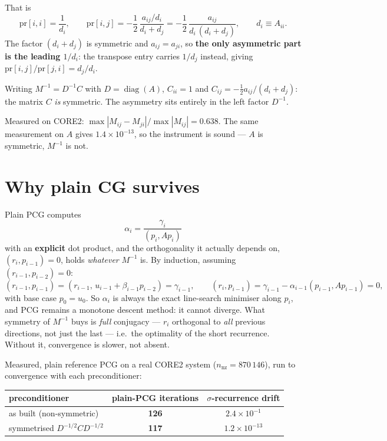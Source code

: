 \documentclass[11pt,a4paper]{article}
\newcommand{\Mi}{M^{-1}}
\begin{document}
That is
\begin{equation}
  \mathrm{pr}[i,i]=\frac{1}{d_i},\qquad
  \mathrm{pr}[i,j]=-\frac{1}{2}\,\frac{a_{ij}/d_i}{d_i+d_j}
  =-\frac{1}{2}\,\frac{a_{ij}}{d_i\,(d_i+d_j)},\qquad d_i\equiv A_{ii}.
\end{equation}
The factor $(d_i+d_j)$ is symmetric and $a_{ij}=a_{ji}$, so \textbf{the only asymmetric part is
the leading $1/d_i$}: the transpose entry carries $1/d_j$ instead, giving
$\mathrm{pr}[i,j]/\mathrm{pr}[j,i]=d_j/d_i$.

Writing $\Mi=D^{-1}C$ with $D=\operatorname{diag}(A)$, $C_{ii}=1$ and
$C_{ij}=-\tfrac12 a_{ij}/(d_i+d_j)$: the matrix $C$ \emph{is} symmetric. The asymmetry sits
entirely in the left factor $D^{-1}$.

Measured on CORE2: $\max|M_{ij}-M_{ji}| / \max|M_{ij}| = \mathbf{0.638}$. The same measurement
on $A$ gives $1.4\times10^{-13}$, so the instrument is sound --- $A$ is symmetric, $\Mi$ is not.

\section{Why plain CG survives}

Plain PCG computes
\[
  \alpha_i=\frac{\gamma_i}{(p_i,Ap_i)}
\]
with an \textbf{explicit} dot product, and the orthogonality it actually depends on,
$(r_i,p_{i-1})=0$, holds \emph{whatever} $\Mi$ is. By induction, assuming
$(r_{i-1},p_{i-2})=0$:
\[
  (r_{i-1},p_{i-1}) = (r_{i-1},\,u_{i-1}+\beta_{i-1}p_{i-2}) = \gamma_{i-1},
  \qquad
  (r_i,p_{i-1}) = \gamma_{i-1} - \alpha_{i-1}(p_{i-1},Ap_{i-1}) = 0,
\]
with base case $p_0=u_0$. So $\alpha_i$ is always the exact line-search minimiser along $p_i$,
and PCG remains a monotone descent method: it cannot diverge. What symmetry of $\Mi$ buys is
\emph{full} conjugacy --- $r_i$ orthogonal to \emph{all} previous directions, not just the last
--- i.e.\ the optimality of the short recurrence. Without it, convergence is slower, not absent.

Measured, plain reference PCG on a real CORE2 system ($n_{\mathrm{nz}}=870\,146$), run to
convergence with each preconditioner:

\begin{center}
\begin{tabular}{@{}lcc@{}}
\toprule
preconditioner & plain-PCG iterations & $\sigma$-recurrence drift\\
\midrule
as built (non-symmetric)               & \textbf{126} & $2.4\times10^{-1}$\\
symmetrised $D^{-1/2}CD^{-1/2}$        & \textbf{117} & $1.2\times10^{-13}$\\
\bottomrule
\end{tabular}
\end{center}
\end{document}
